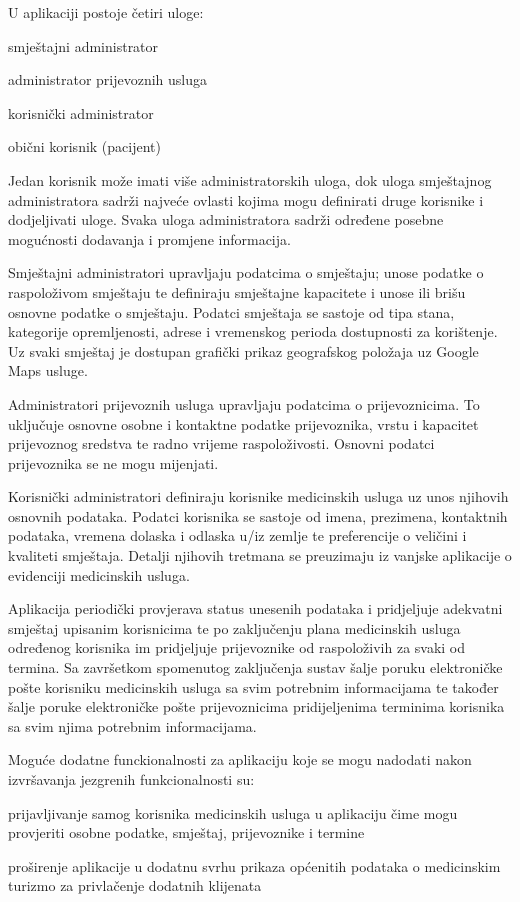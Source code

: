 		\medskip
		U aplikaciji postoje četiri uloge:
		\begin{packed_item}
			\item  smještajni administrator
			\item  administrator prijevoznih usluga
			\item  korisnički administrator
			\item  obični korisnik (pacijent)
		\end{packed_item}
		
		Jedan korisnik može imati više administratorskih uloga, dok uloga smještajnog administratora sadrži najveće ovlasti kojima mogu definirati druge korisnike i dodjeljivati uloge. Svaka uloga administratora sadrži određene posebne mogućnosti dodavanja i promjene informacija.
		
		\smallskip
		Smještajni administratori upravljaju podatcima o smještaju; unose podatke o raspoloživom smještaju te definiraju smještajne kapacitete i unose ili brišu osnovne podatke o smještaju. Podatci smještaja se sastoje od tipa stana, kategorije opremljenosti, adrese i vremenskog perioda dostupnosti za korištenje. Uz svaki smještaj je dostupan grafički prikaz geografskog položaja uz Google Maps usluge.
		
		Administratori prijevoznih usluga upravljaju podatcima o prijevoznicima. To uključuje osnovne osobne i kontaktne podatke prijevoznika, vrstu i kapacitet prijevoznog sredstva te radno vrijeme raspoloživosti. Osnovni podatci prijevoznika se ne mogu mijenjati.
		
		Korisnički administratori definiraju korisnike medicinskih usluga uz unos njihovih osnovnih podataka. Podatci korisnika se sastoje od imena, prezimena, kontaktnih podataka, vremena dolaska i odlaska u/iz zemlje te preferencije o veličini i kvaliteti smještaja. Detalji njihovih tretmana se preuzimaju iz vanjske aplikacije o evidenciji medicinskih usluga.

		\break
		Aplikacija periodički provjerava status unesenih podataka i pridjeljuje adekvatni smještaj upisanim korisnicima te po zaključenju plana medicinskih usluga određenog korisnika im pridjeljuje prijevoznike od raspoloživih za svaki od termina. Sa završetkom spomenutog zaključenja sustav šalje poruku elektroničke pošte korisniku medicinskih usluga sa svim potrebnim informacijama te također šalje poruke elektroničke pošte prijevoznicima pridijeljenima terminima korisnika sa svim njima potrebnim informacijama.
		
		\medskip
		Moguće dodatne funckionalnosti za aplikaciju koje se mogu nadodati nakon izvršavanja jezgrenih funkcionalnosti su:
		\begin{packed_item}
			\item  prijavljivanje samog korisnika medicinskih usluga u aplikaciju čime mogu provjeriti osobne podatke, smještaj, prijevoznike i termine
			\item  proširenje aplikacije u dodatnu svrhu prikaza općenitih podataka o medicinskim turizmo za privlačenje dodatnih klijenata
		\end{packed_item}
		\break
		
